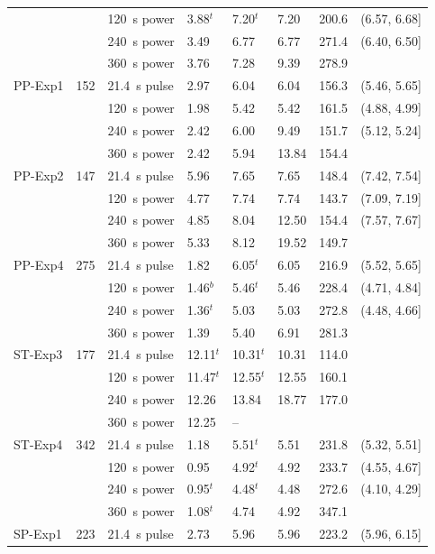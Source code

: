 {\begin{longtable}{p{}p{}p{}p{}p{}p{}p{}p{}}
 &  & 120~s power & 3.88$^{t}$ & 7.20$^{t}$ & 7.20 & 200.6 & (6.57, 6.68] \\
 &  & 240~s power & 3.49 & 6.77 & 6.77 & 271.4 & (6.40, 6.50] \\
 &  & 360~s power & 3.76 & 7.28 & 9.39 & 278.9 &  \\
\midrule
PP-Exp1 & 152 & 21.4~s pulse & 2.97 & 6.04 & 6.04 & 156.3 & (5.46, 5.65] \\
 &  & 120~s power & 1.98 & 5.42 & 5.42 & 161.5 & (4.88, 4.99] \\
 &  & 240~s power & 2.42 & 6.00 & 9.49 & 151.7 & (5.12, 5.24] \\
 &  & 360~s power & 2.42 & 5.94 & 13.84 & 154.4 &  \\
\midrule
PP-Exp2 & 147 & 21.4~s pulse & 5.96 & 7.65 & 7.65 & 148.4 & (7.42, 7.54] \\
 &  & 120~s power & 4.77 & 7.74 & 7.74 & 143.7 & (7.09, 7.19] \\
 &  & 240~s power & 4.85 & 8.04 & 12.50 & 154.4 & (7.57, 7.67] \\
 &  & 360~s power & 5.33 & 8.12 & 19.52 & 149.7 &  \\
\midrule
PP-Exp4 & 275 & 21.4~s pulse & 1.82 & 6.05$^{t}$ & 6.05 & 216.9 & (5.52, 5.65] \\
 &  & 120~s power & 1.46$^{b}$ & 5.46$^{t}$ & 5.46 & 228.4 & (4.71, 4.84] \\
 &  & 240~s power & 1.36$^{t}$ & 5.03 & 5.03 & 272.8 & (4.48, 4.66] \\
 &  & 360~s power & 1.39 & 5.40 & 6.91 & 281.3 &  \\
\midrule
ST-Exp3 & 177 & 21.4~s pulse & 12.11$^{t}$ & 10.31$^{t}$ & 10.31 & 114.0 &  \\
 &  & 120~s power & 11.47$^{t}$ & 12.55$^{t}$ & 12.55 & 160.1 &  \\
 &  & 240~s power & 12.26 & 13.84 & 18.77 & 177.0 &  \\
 &  & 360~s power & 12.25 & -- &  &  &  \\
\midrule
ST-Exp4 & 342 & 21.4~s pulse & 1.18 & 5.51$^{t}$ & 5.51 & 231.8 & (5.32, 5.51] \\
 &  & 120~s power & 0.95 & 4.92$^{t}$ & 4.92 & 233.7 & (4.55, 4.67] \\
 &  & 240~s power & 0.95$^{t}$ & 4.48$^{t}$ & 4.48 & 272.6 & (4.10, 4.29] \\
 &  & 360~s power & 1.08$^{t}$ & 4.74 & 4.92 & 347.1 &  \\
\midrule
SP-Exp1 & 223 & 21.4~s pulse & 2.73 & 5.96 & 5.96 & 223.2 & (5.96, 6.15] \\

\end{longtable}}
